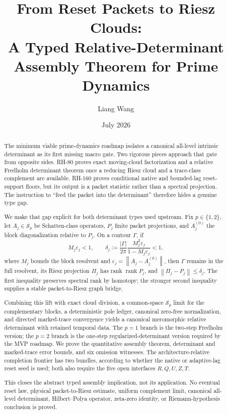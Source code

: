 \documentclass[11pt]{article}
\title{\textbf{From Reset Packets to Riesz Clouds:}\\
\large A Typed Relative-Determinant Assembly Theorem for Prime Dynamics}
\author{Liang Wang}
\date{July 2026}
\theoremstyle{definition}
\theoremstyle{remark}
\newcommand{\rank}{\operatorname{rank}}
\newcommand{\norm}[1]{\left\lVert#1\right\rVert}
\begin{document}
\maketitle

\begin{abstract}
The minimum viable prime-dynamics roadmap isolates a canonical all-level
intrinsic determinant as its first missing macro gate.  Two rigorous pieces
approach that gate from opposite sides.  RH-80 proves exact moving-cloud
factorization and a relative Fredholm determinant theorem once a reducing
Riesz cloud and a trace-class complement are available.  RH-160 proves
conditional native and bounded-lag reset-support floors, but its output is a
packet statistic rather than a spectral projection.  The instruction to
``feed the packet into the determinant'' therefore hides a genuine type gap.

We make that gap explicit for both determinant types used upstream.  Fix
$p\in\{1,2\}$, let $A_j\in\mathcal S_p$ be Schatten-class operators,
$P_j$ finite packet projections, and $A_j^{(0)}$ the block diagonalization
relative to $P_j$.  On a contour $\Gamma$, if
\[
 M_j\varepsilon_j<1,
 \qquad
 \delta_j:=\frac{|\Gamma|}{2\pi}
 \frac{M_j^2\varepsilon_j}{1-M_j\varepsilon_j}<1,
\]
where $M_j$ bounds the block resolvent and
$\varepsilon_j=\norm{A_j-A_j^{(0)}}$, then $\Gamma$ remains in the full
resolvent, its Riesz projection $\Pi_j$ has rank $\rank P_j$, and
$\norm{\Pi_j-P_j}\leq\delta_j$.  The first inequality preserves spectral
rank by homotopy; the stronger second inequality supplies a stable
packet-to-Riesz graph bridge.

Combining this lift with exact cloud division, a common-space
$\mathcal S_p$ limit for the complementary blocks, a deterministic pole
ledger, canonical zero-free normalization, and directed marked-trace
convergence yields a canonical meromorphic relative determinant with
retained temporal data.  The $p=1$ branch is the two-step Fredholm version;
the $p=2$ branch is the one-step regularized-determinant version required by
the MVP roadmap.  We prove the quantitative assembly theorem, determinant
and marked-trace error bounds, and six omission witnesses.  The
architecture-relative completion frontier has two bundles, according to
whether the native or adaptive-lag reset seed is used; both also require the
five open interfaces $R,Q,U,Z,T$.

This closes the abstract typed assembly implication, not its application.
No eventual reset law, physical packet-to-Riesz estimate, uniform complement
limit, canonical all-level determinant, Hilbert--Polya operator, zeta-zero
identity, or Riemann-hypothesis conclusion is proved.
\end{abstract}
\end{document}
